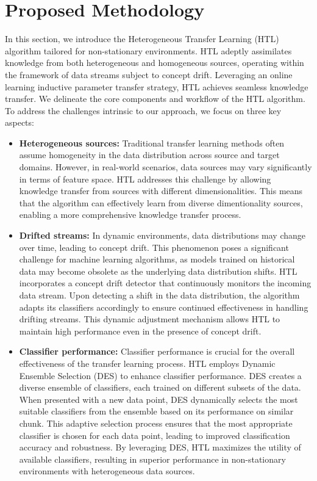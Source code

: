 \section{Proposed Methodology}\label{sec:6_third_proposed_approach}

In this section, we introduce the Heterogeneous Transfer Learning (HTL) algorithm tailored for non-stationary environments. HTL adeptly assimilates knowledge from both heterogeneous and homogeneous sources, operating within the framework of data streams subject to concept drift. Leveraging an online learning inductive parameter transfer strategy, HTL achieves seamless knowledge transfer. We delineate the core components and workflow of the HTL algorithm. To address the challenges intrinsic to our approach, we focus on three key aspects:
\begin{itemize}
	\item \textbf{Heterogeneous sources:} Traditional transfer learning methods often assume homogeneity in the data distribution across source and target domains. However, in real-world scenarios, data sources may vary significantly in terms of feature space. HTL addresses this challenge by allowing knowledge transfer from sources with different dimensionalities. This means that the algorithm can effectively learn from diverse dimentionality sources, enabling a more comprehensive knowledge transfer process.
	\item \textbf{Drifted streams:} In dynamic environments, data distributions may change over time, leading to concept drift. This phenomenon poses a significant challenge for machine learning algorithms, as models trained on historical data may become obsolete as the underlying data distribution shifts. HTL incorporates a concept drift detector that continuously monitors the incoming data stream. Upon detecting a shift in the data distribution, the algorithm adapts its classifiers accordingly to ensure continued effectiveness in handling drifting streams. This dynamic adjustment mechanism allows HTL to maintain high performance even in the presence of concept drift.
	\item \textbf{Classifier performance:} Classifier performance is crucial for the overall effectiveness of the transfer learning process. HTL employs Dynamic Ensemble Selection (DES) to enhance classifier performance. DES creates a diverse ensemble of classifiers, each trained on different subsets of the data. When presented with a new data point, DES dynamically selects the most suitable classifiers from the ensemble based on its performance on similar chunk. This adaptive selection process ensures that the most appropriate classifier is chosen for each data point, leading to improved classification accuracy and robustness. By leveraging DES, HTL maximizes the utility of available classifiers, resulting in superior performance in non-stationary environments with heterogeneous data sources.
\end{itemize}

